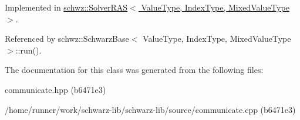 Implemented in \hyperlink{classschwz_1_1SolverRAS_ae0d9bc193a40fb1f27738a2436a3fa36}{schwz\+::\+Solver\+R\+A\+S$<$ Value\+Type, Index\+Type, Mixed\+Value\+Type $>$}.



Referenced by schwz\+::\+Schwarz\+Base$<$ Value\+Type, Index\+Type, Mixed\+Value\+Type $>$\+::run().



The documentation for this class was generated from the following files\+:\begin{DoxyCompactItemize}
\item 
communicate.\+hpp (b6471e3)\item 
/home/runner/work/schwarz-\/lib/schwarz-\/lib/source/communicate.\+cpp (b6471e3)\end{DoxyCompactItemize}
